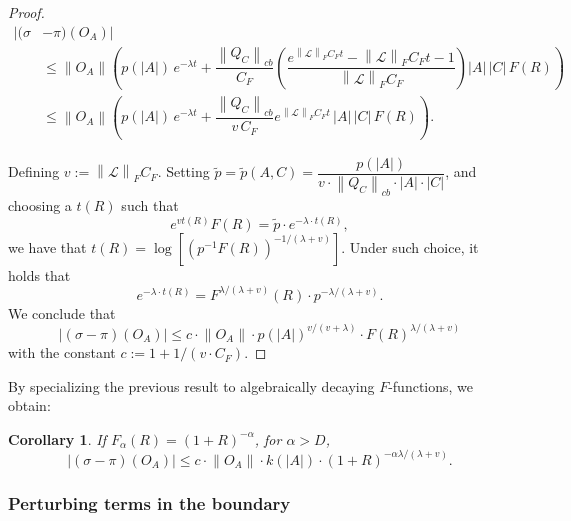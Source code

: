 \documentclass[11pt]{article}
\numberwithin{equation}{section}
\numberwithin{figure}{section}
\numberwithin{table}{section}
\theoremstyle{definition}
\theoremstyle{plain}
\newtheorem{cor}[thm]{Corollary}
\theoremstyle{remark}
\newcommand{\Li}{\mathcal{L}}
\newcommand{\norm}[1]{\left\lVert#1\right\rVert}
\newcommand{\normm}[2]{\left\lVert#1\right\rVert_{#2}}
\newcommand{\abs}[1]{\left \vert#1\right\vert}
\begin{document}
\begin{proof}
\begin{align}
\lvert (\sigma&-\pi)(O_A)\rvert\\
\nonumber&\le \norm{O_A}\left( p(\abs{A})\,e^{-\lambda t} + \dfrac{\normm{Q_C}{cb}}{C_F}\left( \dfrac{e^{\normm{\Li}{F} C_F t}-\normm{\Li}{F} C_F t-1}{\normm{\Li}{F} C_F}\right)\abs{A}\,\abs{C}\,F(R) \right) \\
&\le \norm{O_A}\left( p(\abs{A})\,e^{-\lambda t} + \dfrac{\normm{Q_C}{cb}}{v\,C_F} e^{\normm{\Li}{F} C_F t}\,\abs{A}\,\abs{C}\,F(R) \right). \nonumber
\end{align}


Defining $v:=\normm{\Li}{F} C_F$. Setting $\tilde{p}=\tilde{p}(A,C)=\dfrac{p(\abs{A})}{v\cdot \normm{Q_C}{cb}\cdot \abs{A}\cdot \abs{C}}$, and choosing a $t(R)$ such that
\begin{equation}
    e^{v t(R)}F(R)=\tilde{p} \cdot e^{-\lambda \cdot t(R)},
\end{equation}
we have that $t(R)=\log\left [ (p^{-1} F(R) )^{-1/(\lambda + v)}  \right ]$. Under such choice, it holds that
\begin{equation}
    e^{-\lambda \cdot t(R)}=F^{\lambda/(\lambda +v)}(R) \cdot  p^{-\lambda/(\lambda +v)}.
\end{equation}
We conclude that
\begin{equation}
    \abs{(\sigma-\pi)(O_A)}\leq c\cdot \norm{O_A} \cdot p(\abs{A})^{v/(v+\lambda)}\cdot F(R)^{\lambda/(\lambda +v)}
\end{equation}
with the constant $c:=1+1/(v\cdot C_F)$.
\end{proof}

By specializing the previous result to algebraically decaying $F$-functions, we obtain:
\medskip
\begin{cor}
    If $F_\alpha(R)=(1+R)^{-\alpha}$, for $\alpha>D$,
    \begin{equation}
        \abs{(\sigma-\pi)(O_A)}\leq c\cdot \norm{O_A} \cdot k(\abs{A})\cdot (1+R)^{-\alpha \lambda/(\lambda + v)}.
    \end{equation}
\end{cor}




\subsubsection{Perturbing terms in the boundary }\label{subsubsec:perturbingBoundary}
\end{document}
